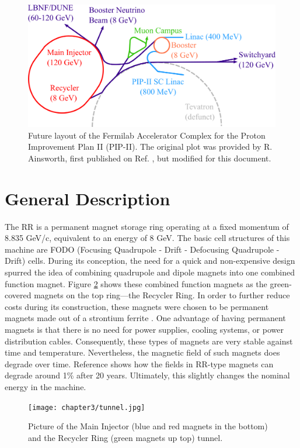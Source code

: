 \begin{figure}[H]
   \centering
   \includegraphics[width=\columnwidth]{chapter3/complexPIPII.png}
   \caption{Future layout of the Fermilab Accelerator Complex for the Proton Improvement Plan II (PIP-II). The original plot was provided by R. Ainsworth, first published on Ref. \cite{rr1}, but modified for this document.}
   \label{fig:fnalpip2}
\end{figure}

\section{\label{sec:rrgen}General Description}

The RR is a permanent magnet storage ring operating at a fixed momentum of 8.835 GeV/c, equivalent to an energy of 8 GeV. The basic cell structures of this machine are FODO (Focusing Quadrupole - Drift - Defocusing Quadrupole - Drift) cells. During its conception, the need for a quick and non-expensive design spurred the idea of combining quadrupole and dipole magnets into one combined function magnet. Figure \ref{fig:rrtunnel} shows these combined function magnets as the green-covered magnets on the top ring---the Recycler Ring. In order to further reduce costs during its construction, these magnets were chosen to be permanent magnets made out of a strontium ferrite \cite{rr0}. One advantage of having permanent magnets is that there is no need for power supplies, cooling systems, or power distribution cables. Consequently, these types of magnets are very stable against time and temperature. Nevertheless, the magnetic field of such magnets does degrade over time. Reference \cite{rr1} shows how the fields in RR-type magnets can degrade around 1\% after 20 years. Ultimately, this slightly changes the nominal energy in the machine. 

\begin{figure}[H]
   \centering
   \texttt{[image: chapter3/tunnel.jpg]}
   \caption{Picture of the Main Injector (blue and red magnets in the bottom) and the Recycler Ring (green magnets up top) tunnel.}
   \label{fig:rrtunnel}
\end{figure}

